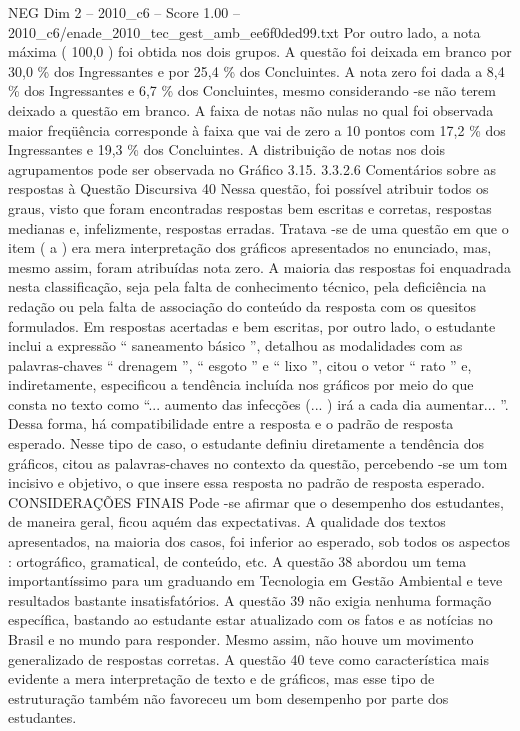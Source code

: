 \begin{textsample}{NEG Dim 2 – 2010\_c6 – Score 1.00 – 2010\_c6/enade\_2010\_tec\_gest\_amb\_ee6f0ded99.txt}
Por outro lado, a nota máxima ( 100,0 ) foi obtida nos dois grupos.
A questão foi deixada em branco por 30,0 \% dos Ingressantes e por 25,4 \% dos Concluintes.
A nota zero foi dada a 8,4 \% dos Ingressantes e 6,7 \% dos Concluintes, mesmo considerando -se não terem deixado a questão em branco.
A faixa de notas não nulas no qual foi observada maior freqüência corresponde à faixa que vai de zero a 10 pontos com 17,2 \% dos Ingressantes e 19,3 \% dos Concluintes.
A distribuição de notas nos dois agrupamentos pode ser observada no Gráfico 3.15. 3.3.2.6 Comentários sobre as respostas à Questão Discursiva 40 Nessa questão, foi possível atribuir todos os graus, visto que foram encontradas respostas bem escritas e corretas, respostas medianas e, infelizmente, respostas erradas.
Tratava -se de uma questão em que o item ( a ) era mera interpretação dos gráficos apresentados no enunciado, mas, mesmo assim, foram atribuídas nota zero.
A maioria das respostas foi enquadrada nesta classificação, seja pela falta de conhecimento técnico, pela deficiência na redação ou pela falta de associação do conteúdo da resposta com os quesitos formulados.
Em respostas acertadas e bem escritas, por outro lado, o estudante inclui a expressão “ saneamento básico ”, detalhou as modalidades com as palavras-chaves “ drenagem ”, “ esgoto ” e “ lixo ”, citou o vetor “ rato ” e, indiretamente, especificou a tendência incluída nos gráficos por meio do que consta no texto como “... aumento das infecções (... ) irá a cada dia aumentar... ”.
Dessa forma, há compatibilidade entre a resposta e o padrão de resposta esperado.
Nesse tipo de caso, o estudante definiu diretamente a tendência dos gráficos, citou as palavras-chaves no contexto da questão, percebendo -se um tom incisivo e objetivo, o que insere essa resposta no padrão de resposta esperado.
CONSIDERAÇÕES FINAIS Pode -se afirmar que o desempenho dos estudantes, de maneira geral, ficou aquém das expectativas.
A qualidade dos textos apresentados, na maioria dos casos, foi inferior ao esperado, sob todos os aspectos : ortográfico, gramatical, de conteúdo, etc.
A questão 38 abordou um tema importantíssimo para um graduando em Tecnologia em Gestão Ambiental e teve resultados bastante insatisfatórios.
A questão 39 não exigia nenhuma formação específica, bastando ao estudante estar atualizado com os fatos e as notícias no Brasil e no mundo para responder.
Mesmo assim, não houve um movimento generalizado de respostas corretas.
A questão 40 teve como característica mais evidente a mera interpretação de texto e de gráficos, mas esse tipo de estruturação também não favoreceu um bom desempenho por parte dos estudantes.

\end{textsample}
